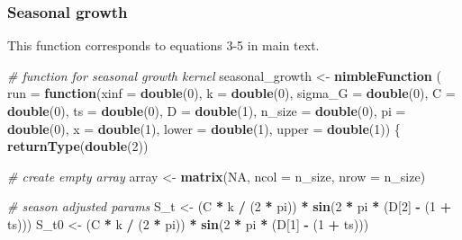 \documentclass[
]{article}
\newenvironment{Shaded}{\begin{snugshade}}{\end{snugshade}}
\newcommand{\AttributeTok}[1]{\textcolor[rgb]{0.13,0.29,0.53}{#1}}
\newcommand{\CommentTok}[1]{\textcolor[rgb]{0.56,0.35,0.01}{\textit{#1}}}
\newcommand{\ConstantTok}[1]{\textcolor[rgb]{0.56,0.35,0.01}{#1}}
\newcommand{\ControlFlowTok}[1]{\textcolor[rgb]{0.13,0.29,0.53}{\textbf{#1}}}
\newcommand{\DecValTok}[1]{\textcolor[rgb]{0.00,0.00,0.81}{#1}}
\newcommand{\FunctionTok}[1]{\textcolor[rgb]{0.13,0.29,0.53}{\textbf{#1}}}
\newcommand{\NormalTok}[1]{#1}
\newcommand{\OtherTok}[1]{\textcolor[rgb]{0.56,0.35,0.01}{#1}}
\newcommand{\SpecialCharTok}[1]{\textcolor[rgb]{0.81,0.36,0.00}{\textbf{#1}}}
\begin{document}
\subsubsection{Seasonal growth}\label{seasonal-growth}

This function corresponds to equations 3-5 in main text.

\begin{Shaded}
\begin{Highlighting}[]
\CommentTok{\# function for seasonal growth kernel}
\NormalTok{seasonal\_growth }\OtherTok{\textless{}{-}} \FunctionTok{nimbleFunction}\NormalTok{ (}
  \AttributeTok{run =} \ControlFlowTok{function}\NormalTok{(}\AttributeTok{xinf =} \FunctionTok{double}\NormalTok{(}\DecValTok{0}\NormalTok{), }\AttributeTok{k =} \FunctionTok{double}\NormalTok{(}\DecValTok{0}\NormalTok{),}
                 \AttributeTok{sigma\_G =} \FunctionTok{double}\NormalTok{(}\DecValTok{0}\NormalTok{), }\AttributeTok{C =} \FunctionTok{double}\NormalTok{(}\DecValTok{0}\NormalTok{),}
                 \AttributeTok{ts =} \FunctionTok{double}\NormalTok{(}\DecValTok{0}\NormalTok{), }\AttributeTok{D =} \FunctionTok{double}\NormalTok{(}\DecValTok{1}\NormalTok{),}
                 \AttributeTok{n\_size =} \FunctionTok{double}\NormalTok{(}\DecValTok{0}\NormalTok{), }\AttributeTok{pi =} \FunctionTok{double}\NormalTok{(}\DecValTok{0}\NormalTok{), }\AttributeTok{x =} \FunctionTok{double}\NormalTok{(}\DecValTok{1}\NormalTok{),}
                 \AttributeTok{lower =} \FunctionTok{double}\NormalTok{(}\DecValTok{1}\NormalTok{), }\AttributeTok{upper =} \FunctionTok{double}\NormalTok{(}\DecValTok{1}\NormalTok{))}
\NormalTok{  \{}
    \FunctionTok{returnType}\NormalTok{(}\FunctionTok{double}\NormalTok{(}\DecValTok{2}\NormalTok{))}

    \CommentTok{\# create empty array}
\NormalTok{    array }\OtherTok{\textless{}{-}} \FunctionTok{matrix}\NormalTok{(}\ConstantTok{NA}\NormalTok{, }\AttributeTok{ncol =}\NormalTok{ n\_size, }\AttributeTok{nrow =}\NormalTok{ n\_size)}

    \CommentTok{\# season adjusted params}
\NormalTok{    S\_t }\OtherTok{\textless{}{-}}\NormalTok{ (C }\SpecialCharTok{*}\NormalTok{ k }\SpecialCharTok{/}\NormalTok{ (}\DecValTok{2} \SpecialCharTok{*}\NormalTok{ pi)) }\SpecialCharTok{*} \FunctionTok{sin}\NormalTok{(}\DecValTok{2} \SpecialCharTok{*}\NormalTok{ pi }\SpecialCharTok{*}\NormalTok{ (D[}\DecValTok{2}\NormalTok{] }\SpecialCharTok{{-}}\NormalTok{ (}\DecValTok{1} \SpecialCharTok{+}\NormalTok{ ts)))}
\NormalTok{    S\_t0 }\OtherTok{\textless{}{-}}\NormalTok{ (C }\SpecialCharTok{*}\NormalTok{ k }\SpecialCharTok{/}\NormalTok{ (}\DecValTok{2} \SpecialCharTok{*}\NormalTok{ pi)) }\SpecialCharTok{*} \FunctionTok{sin}\NormalTok{(}\DecValTok{2} \SpecialCharTok{*}\NormalTok{ pi }\SpecialCharTok{*}\NormalTok{ (D[}\DecValTok{1}\NormalTok{] }\SpecialCharTok{{-}}\NormalTok{ (}\DecValTok{1} \SpecialCharTok{+}\NormalTok{ ts)))}


\end{Highlighting}
\end{Shaded}
\end{document}
